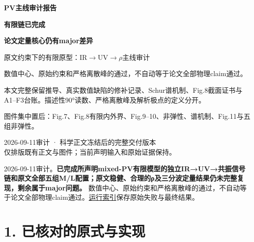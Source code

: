 \documentclass[
  10pt,
  a4paper,
]{article}
\author{}
\date{}
\begin{document}
\begin{titlepage}
\thispagestyle{empty}
\vspace*{18mm}
\begin{center}
{\Huge\bfseries PV主线审计报告\par}
\vspace{9mm}
{\LARGE\bfseries 有限链已完成\par}
\vspace{3mm}
{\LARGE\bfseries 论文定量核心仍有major差异\par}
\vspace{11mm}
{\large 原文约束下的有限原型：IR$\to$UV$\to\rho$主线审计\par}
\vspace{10mm}
\end{center}
\vspace{12mm}
\noindent 数值中心、原始约束和严格离散峰的通过，不自动等于论文全部物理claim通过。
\par\vspace{6mm}
\noindent 本文完整保留推导、真实数值缺陷的修补记录、Schur谱机制、Fig.8截面证书与A1--F3台账。描述性90°读数、严格离散峰及解析极点的定义分开。
\par\vspace{6mm}
\noindent 图件集中置后：Fig.7、Fig.8有限内外界、Fig.9--10、非弹性、谱机制、Fig.11与五组非弹性。
\par\vfill
\begin{center}
2026-09-11审计 · 科学正文冻结后的完整交付版本\\
\small 仅排版既有正文与图件；当前声明输入和原始证据保持。
\end{center}
\end{titlepage}
\setcounter{page}{2}
\tableofcontents
\clearpage

2026-09-11审计。\textbf{已完成所声明mixed-PV有限模型的独立IR→UV→共振信号链和原文全部五组M/L配置；原文稳健、合理的ρ及三分波定量结果仍未完整复现，剩余属于major问题。}
数值中心、原始约束和严格离散峰的通过，不自动等于论文全部物理claim通过。\href{../PROGRESS.json}{运行索引}保存原始失败与最终结果。

\section{1.
已核对的原式与实现}\label{ux5df2ux6838ux5bf9ux7684ux539fux5f0fux4e0eux5b9eux73b0}
\end{document}
